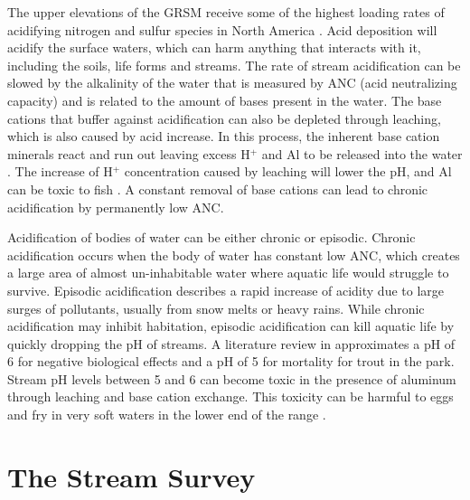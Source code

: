 The upper elevations of the GRSM receive some of the highest loading rates of acidifying nitrogen and sulfur species in North America \citep{johnson1992atmospheric}.  
Acid deposition will acidify the surface waters, which can harm anything that interacts with it, including the soils, life forms and streams.
The rate of stream acidification can be slowed by the alkalinity of the water that is measured by ANC (acid neutralizing capacity) and is related to the amount of bases present in the water.
The base cations that buffer against acidification can also be depleted through leaching, which is also caused by acid increase.
In this process, the inherent base cation minerals react and run out leaving excess H$^+$ and Al to be released into the water \citep{sullivan2004}.
The increase of H$^+$ concentration caused by leaching will lower the pH, and Al can be toxic to fish \citep{driscoll2003effects}.
A constant removal of base cations can lead to chronic acidification by permanently low ANC.

Acidification of bodies of water can be either chronic or episodic. 
Chronic acidification occurs when the body of water has constant low ANC, which creates a large area of  almost un-inhabitable water where aquatic life would struggle to survive. 
Episodic acidification describes a rapid increase of acidity due to large surges of pollutants, usually from snow melts or heavy rains.  
While chronic acidification may inhibit habitation, episodic acidification can kill aquatic life by quickly dropping the pH of streams.
A literature review in \citet{neff2009physiological} approximates a pH of 6 for negative biological effects and a pH of 5 for mortality for trout in the park.  
Stream pH levels between 5 and 6 can become toxic in the presence of aluminum through leaching and base cation exchange.
This toxicity can be harmful to eggs and fry in very soft waters in the lower end of the range \citep{robinson2008ph}.  


\section{The Stream Survey} 

